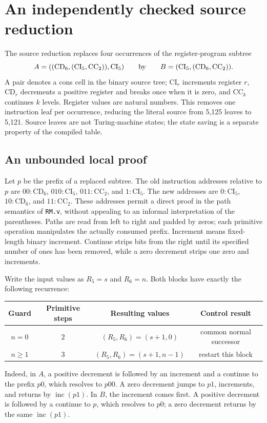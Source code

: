\section{An independently checked source reduction}
\label{sec:source229-independent}

The source reduction replaces four occurrences of the register-program
subtree
\[
 A=((\mathrm{CD}_6,(\mathrm{CI}_5,\mathrm{CC}_2)),\mathrm{CI}_5)
 \qquad\hbox{by}\qquad
 B=(\mathrm{CI}_5,(\mathrm{CD}_6,\mathrm{CC}_2)).
\]
A pair denotes a cons cell in the binary source tree; $\mathrm{CI}_r$
increments register $r$, $\mathrm{CD}_r$ decrements a positive register
and breaks once when it is zero, and $\mathrm{CC}_k$ continues $k$
levels.  Register values are natural numbers.  This removes one
instruction leaf per occurrence, reducing the literal source from
5,125 leaves to 5,121.  Source leaves are not Turing-machine states;
the state saving is a separate property of the compiled table.

\subsection{An unbounded local proof}

Let $p$ be the prefix of a replaced subtree.  The old instruction
addresses relative to $p$ are
$00:\mathrm{CD}_6$, $010:\mathrm{CI}_5$,
$011:\mathrm{CC}_2$, and $1:\mathrm{CI}_5$.
The new addresses are $0:\mathrm{CI}_5$,
$10:\mathrm{CD}_6$, and $11:\mathrm{CC}_2$.
These addresses permit a direct proof in the path semantics of
\texttt{RM.v}, without appealing to an informal interpretation of
the parentheses.  Paths are read from left to right and padded by
zeros; each primitive operation manipulates the actually consumed
prefix.  Increment means fixed-length binary increment.  Continue
strips bits from the right until its specified number of ones has
been removed, while a zero decrement strips one zero and increments.

Write the input values as $R_5=s$ and $R_6=n$.  Both blocks have
exactly the following recurrence:
\begin{center}
\begin{tabular}{c|c|c|c}
Guard & Primitive steps & Resulting values & Control result \\
\hline
$n=0$ & $2$ & $(R_5,R_6)=(s+1,0)$ & common normal successor \\
$n\geq1$ & $3$ & $(R_5,R_6)=(s+1,n-1)$ & restart this block
\end{tabular}
\end{center}
Indeed, in $A$, a positive decrement is followed by an increment
and a continue to the prefix $p0$, which resolves to $p00$.
A zero decrement jumps to $p1$, increments, and returns by
$\operatorname{inc}(p1)$.
In $B$, the increment comes first.  A positive decrement is followed
by a continue to $p$, which resolves to $p0$; a zero decrement
returns by the same $\operatorname{inc}(p1)$.

